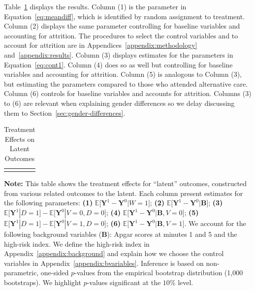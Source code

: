 Table~\ref{table:treatfactors} displays the results. Column (1) is the parameter in Equation~\eqref{eq:meandiff}, which is identified by random assignment to treatment. Column (2) displays the same parameter controlling for baseline variables and accounting for attrition. The procedures to select the control variables and to account for attrition are in Appendices~\ref{appendix:methodology} and~\ref{appendix:results}. Column (3) displays estimates for the parameters in Equation~\eqref{eq:cont1}. Column (4) does so as well but controlling for baseline variables and accounting for attrition. Column (5) is analogous to Column (3), but estimating the parameters compared to those who attended alternative care. Column (6) controls for baseline variables and accounts for attrition. Columns (3) to (6) are relevant when explaining gender differences so we delay discussing them to Section~\ref{sec:gender-differences}.

\begin{table}
\begin{threeparttable}
\caption{Treatment Effects on Latent Outcomes} \label{table:treatfactors}
\centering 
\begin{tabularx}{22.5cm}{XcX}
&  & 
\end{tabularx}
\begin{tablenotes}
\footnotesize
\item \textbf{Note:} This table shows the treatment effects for ``latent'' outcomes, constructed from various related outcomes to the latent. Each column present estimates for the following parameters: \textbf{(1)} $\mathbb{E} \big[ \bm{Y}^1 - \bm{Y}^0 | W = 1]$; {\textbf{(2)} $\mathbb{E} \big[ \bm{Y}^1 - \bm{Y}^0 | \bm{B} \big]$}; {\textbf{(3)} $\mathbb{E} \big[ \bm{Y}^1 | D=1 \big] - \mathbb{E} \big[ \bm{Y}^0 | V=0, D=0 \big]$}; {\textbf{(4)} $\mathbb{E} \big[ \bm{Y}^1 - \bm{Y}^0 | \bm{B}, V=0 \big] $}; {\textbf{(5)} $\mathbb{E} \big[ \bm{Y}^1 | D=1 \big] - \mathbb{E} \big[ \bm{Y}^0 | V=1, D = 0 \big]$}; {\textbf{(6)} $\mathbb{E} \big[ \bm{Y}^1 - \bm{Y}^0 | \bm{B}, V=1 \big]$}. We account for the following background variables ($\bm{B}$): Apgar scores at minutes 1 and 5 and the high-risk index. We define the high-risk index in Appendix~\ref{appendix:background} and explain how we choose the control variables in Appendix~\ref{appendix:bvariables}. Inference is based on non-parametric, one-sided $p$-values from the empirical bootstrap distribution (1,000 bootstraps). We highlight $p$-values significant at the $10\%$ level.
\end{tablenotes}
\end{threeparttable}
\end{table}


